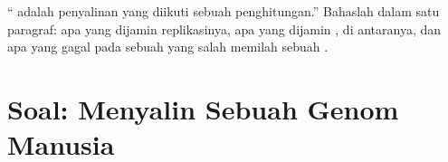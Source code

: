 \begin{exercise}[$\star\star\star$]\label{exo:b1:replication-mitosis:12}
`` adalah penyalinan  yang diikuti sebuah penghitungan.''
Bahaslah dalam satu paragraf: apa yang dijamin replikasinya, apa yang
dijamin ,  di antaranya, dan apa yang
gagal pada sebuah  yang salah memilah sebuah .
\end{exercise}

\section{Soal: Menyalin Sebuah Genom Manusia}


